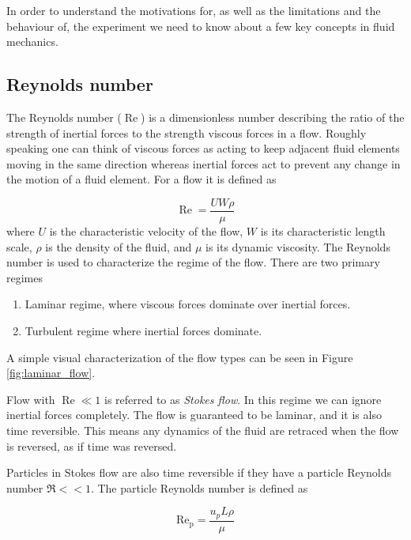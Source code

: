 \label{sec:fluid}
In order to understand the motivations for, as well as the limitations and the behaviour of, the experiment we need to know about a few key concepts in fluid mechanics.

\subsection{Reynolds number}
The Reynolds number ($\operatorname{Re}$) is a dimensionless number describing the ratio of the strength of inertial forces to the strength viscous forces in a flow. Roughly speaking one can think of viscous forces as acting to keep adjacent fluid elements moving in the same direction whereas inertial forces act to prevent any change in the motion of a fluid element. For a flow it is defined as \cite{introfluid}

\begin{equation}\label{eq:reynolds}
\operatorname{Re} = \frac{U W \rho}{\mu}
\end{equation}
where $U$ is the characteristic velocity of the flow, $W$ is its characteristic length scale, $\rho$ is the density of the fluid, and $\mu$ is its dynamic viscosity. The Reynolds number is used to characterize the regime of the flow. There are two primary regimes
\begin{enumerate}
\item Laminar regime, where viscous forces dominate over inertial forces.
\item Turbulent regime where inertial forces dominate.
\end{enumerate}

\noindent A simple visual characterization of the flow types can be seen in Figure \ref{fig:laminar_flow}. 

Flow with $\operatorname{Re}\ll 1$ is referred to as \emph{Stokes flow}. In this regime we can ignore inertial forces completely. The flow is guaranteed to be laminar, and it is also time reversible. This means any dynamics of the fluid are retraced when the flow is reversed, as if time was reversed. ~\cite{introfluid3}
 
Particles in Stokes flow are also time reversible if they have a particle Reynolds number $\Re << 1$. The particle Reynolds number is defined as \cite{JonasLic}

\begin{equation}\label{eq:reynoldsparticle}
\operatorname{Re_p} = \frac{u_p L \rho}{\mu}
\end{equation}

